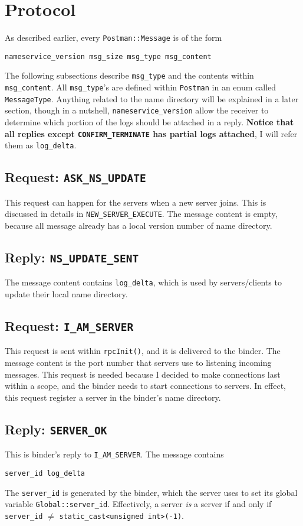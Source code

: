 \section{Protocol}
As described earlier, every {\tt Postman::Message} is of the form

\begin{verbatim}
nameservice_version msg_size msg_type msg_content
\end{verbatim}
The following subsections describe {\tt msg\_type} and the contents within {\tt msg\_content}.
All {\tt msg\_type}'s are defined within {\tt Postman} in an enum called {\tt MessageType}.
Anything related to the name directory will be explained in a later section, though in a nutshell, {\tt nameservice\_version} allow the receiver to determine which portion of the logs should be attached in a reply.
{\bf Notice that all replies except {\tt CONFIRM\_TERMINATE} has partial logs attached}, I will refer them as {\tt log\_delta}.

\subsection{Request: \tt ASK\_NS\_UPDATE}
This request can happen for the servers when a new server joins.
This is discussed in details in {\tt NEW\_SERVER\_EXECUTE}.
The message content is empty, because all message already has a local version number of name directory.

\subsection{Reply: \tt NS\_UPDATE\_SENT}
The message content contains {\tt log\_delta}, which is used by servers/clients to update their local name directory.

\subsection{Request: \tt I\_AM\_SERVER}
This request is sent within {\tt rpcInit()}, and it is delivered to the binder.
The message content is the port number that servers use to listening incoming messages.
This request is needed because I decided to make connections last within a scope, and the binder needs to start connections to servers.
In effect, this request register a server in the binder's name directory.

\subsection{Reply: \tt SERVER\_OK}
This is binder's reply to {\tt I\_AM\_SERVER}.
The message contains
\begin{verbatim}
server_id log_delta
\end{verbatim}
The {\tt server\_id} is generated by the binder, which the server uses to set its global variable {\tt Global::server\_id}.
Effectively, a server \emph{is} a server if and only if {\tt server\_id} $\neq$ {\tt static\_cast<unsigned int>(-1)}.

